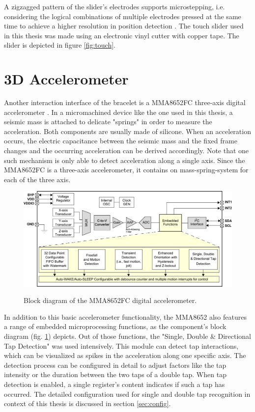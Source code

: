 A zigzagged pattern of the slider's electrodes supports microstepping, i.e. considering the logical combinations of multiple electrodes pressed at the same time to achieve a higher resolution in position detection \cite{Camacho2010}. The touch slider used in this thesis was made using an electronic vinyl cutter with copper tape. The slider is depicted in figure \ref{fig:touch}.

\section{3D Accelerometer}
\label{sec:accel}
Another interaction interface of the bracelet is a MMA8652FC three-axis digital accelerometer \cite{datasheet:mma8652}. In a micromachined device like the one used in this thesis, a seismic mass is attached to delicate "springs" in order to measure the acceleration. Both components are usually made of silicone. When an acceleration occurs, the electric capacitance between the seismic mass and the fixed frame changes and the occurring acceleration can be derived accordingly. Note that one such mechanism is only able to detect acceleration along a single axis. Since the MMA8652FC is a three-axis accelerometer, it contains on mass-spring-system for each of the three axis.

\begin{figure}[bth]
	\myfloatalign
	\includegraphics[width=\linewidth]{gfx/accel.pdf}
	\label{fig:accel}
	\caption{Block diagram of the MMA8652FC digital accelerometer. \cite{datasheet:mma8652}}
\end{figure}

In addition to this basic accelerometer functionality, the MMA8652 also features a range of embedded microprocessing functions, as the component's block diagram (fig. \ref{fig:accel}) depicts. Out of those functions, the "Single, Double \& Directional Tap Detection" was used intensively. This module can detect tap interactions, which can be visualized as spikes in the acceleration along one specific axis. The detection process can be configured in detail to adjust factors like the tap intensity or the duration between the two taps of a double tap. When tap detection is enabled, a single register's content indicates if such a tap has occurred. The detailed configuration used for single and double tap recognition in context of this thesis is discussed in section \ref{sec:config}.

